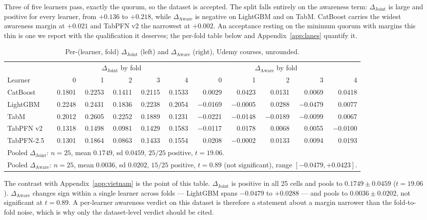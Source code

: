 \documentclass[10pt,letterpaper]{article}
\newcommand{\dj}{\Delta_{\mathrm{Joint}}}
\newcommand{\da}{\Delta_{\mathrm{Aware}}}
\begin{document}
\noindent Three of five learners pass, exactly the quorum, so the dataset is accepted. The split falls
entirely on the awareness term: $\dj$ is large and positive for every learner, from $+0.136$
to $+0.218$, while $\da$ is negative on LightGBM and on TabM. CatBoost carries the widest
awareness margin at $+0.021$ and TabPFN v2 the narrowest at $+0.002$. An acceptance resting on
the minimum quorum with margins this thin is one we report with the qualification it deserves;
the per-fold table below and Appendix~\ref{app:lanes} quantify it.


\begin{table}[H]
\centering\small
\caption{Per-(learner, fold) $\dj$ (left) and $\da$ (right), Udemy courses, unrounded.}
\begin{tabular}{lrrrrr@{\hskip 18pt}rrrrr}
\toprule
& \multicolumn{5}{c}{$\dj$ by fold} & \multicolumn{5}{c}{$\da$ by fold} \\
\cmidrule(r){2-6}\cmidrule(l){7-11}
Learner & 0 & 1 & 2 & 3 & 4 & 0 & 1 & 2 & 3 & 4 \\
\midrule
CatBoost   & 0.1801 & 0.2253 & 0.1411 & 0.2115 & 0.1533 & \phantom{-}0.0029 & \phantom{-}0.0423 & \phantom{-}0.0131 & \phantom{-}0.0069 & \phantom{-}0.0418 \\
LightGBM   & 0.2248 & 0.2431 & 0.1836 & 0.2238 & 0.2054 & $-$0.0169 & $-$0.0005 & 0.0288 & $-$0.0479 & 0.0077 \\
TabM       & 0.2012 & 0.2605 & 0.2252 & 0.1889 & 0.1231 & $-$0.0221 & $-$0.0148 & $-$0.0189 & $-$0.0099 & 0.0067 \\
TabPFN v2  & 0.1318 & 0.1498 & 0.0981 & 0.1429 & 0.1583 & $-$0.0117 & 0.0178 & 0.0068 & 0.0055 & $-$0.0100 \\
TabPFN-2.5 & 0.1301 & 0.1864 & 0.0863 & 0.1433 & 0.1554 & 0.0208 & $-$0.0002 & 0.0133 & 0.0094 & 0.0193 \\
\midrule
\multicolumn{11}{l}{Pooled $\dj$: $n{=}25$, mean $0.1749$, sd $0.0459$, $25/25$ positive, $t = 19.06$.} \\
\multicolumn{11}{l}{Pooled $\da$: $n{=}25$, mean $0.0036$, sd $0.0202$, $15/25$ positive, $t = 0.89$ (not significant), range $[-0.0479, +0.0423]$.} \\
\bottomrule
\end{tabular}
\end{table}

\noindent The contrast with Appendix~\ref{app:vietnam} is the point of this table. $\dj$ is positive in
all 25 cells and pools to $0.1749 \pm 0.0459$ ($t = 19.06$). $\da$ changes sign within a
single learner across folds --- LightGBM spans $-0.0479$ to $+0.0288$ --- and pools to
$0.0036 \pm 0.0202$, not significant at $t = 0.89$. A per-learner awareness verdict on this
dataset is therefore a statement about a margin narrower than the fold-to-fold noise, which is
why only the dataset-level verdict should be cited.
\end{document}
